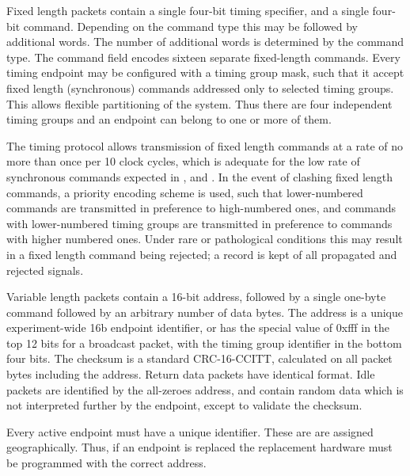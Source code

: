 \documentclass{dune}
\begin{document}
Fixed length packets contain a single four-bit timing  specifier, and a single four-bit command. Depending on the command type this may be followed by additional words. The number of additional words is determined by the command type. The command field encodes sixteen separate fixed-length commands. Every timing endpoint may be configured with a timing group mask, such that it accept fixed length (synchronous) commands addressed only to selected timing groups. This allows flexible partitioning of the system. Thus there are four independent timing groups and an endpoint can belong to one or more of them.

The timing protocol allows transmission of fixed length commands at a rate of no more than once per 10 clock cycles, which is adequate for the low rate of synchronous commands expected in , and  . In the event of clashing fixed length commands, a priority encoding scheme is used, such that lower-numbered commands are transmitted in preference to high-numbered ones, and commands with lower-numbered timing groups are transmitted in preference to commands with higher numbered ones. Under rare or pathological conditions this may result in a fixed length command being rejected; a record is kept of all propagated and rejected signals.

Variable length packets contain a 16-bit address, followed by a single one-byte command followed by an arbitrary number of data bytes. The address is a unique experiment-wide 16b endpoint identifier, or has the special value of 0xfff in the top 12 bits for a broadcast packet, with the timing group identifier in the bottom four bits. The checksum is a standard CRC-16-CCITT, calculated on all packet bytes including the address. Return data packets have identical format. Idle packets are identified by the all-zeroes address, and contain random data which is not interpreted further by the endpoint, except to validate the checksum.





Every active endpoint must have a unique identifier. These are are assigned geographically. Thus, if an endpoint is replaced the replacement hardware must be programmed with the correct address.
\end{document}

